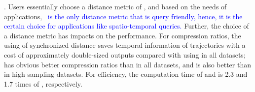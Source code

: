 . Users essentially choose a distance metric of \ped, \sed and \dad based on the needs of applications, \textcolor{blue} {\eg~\sed is the only distance metric that is query friendly, hence, it is the certain choice for applications like spatio-temporal queries.}
%
Further, the choice of a distance metric has impacts on the performance.
For compression ratios, the using of synchronized distance \sed saves temporal information of trajectories with a cost of approximately double-sized outputs compared with using \ped in all datasets; \ped has obvious better compression ratios than \dad in all datasets, and \sed is also better than \dad in high sampling datasets.
For efficiency, the computation time of \ped and \sed is 2.3 and 1.7 times of \dad, respectively.



%
%
